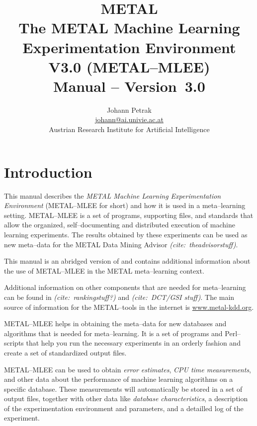 \documentclass[a4paper,10pt,twoside]{article}
\newcommand{\manualversion}{3.0}
\newcommand{\eeversion}{3.0}
\newcommand{\eenamelong}{METAL Machine Learning Experimentation Environment}
\newcommand{\eenameshort}{\textsf{METAL--MLEE}}
\newcommand{\citex}[1]{\textsl{(cite:~{#1})}}
\begin{document}
\author{Johann Petrak \\
  \url{johann@ai.univie.ac.at} \\[2em]
  Austrian Research Institute for
  Artificial Intelligence \\
}
\title{METAL \\[5em]
  The \textsf{ \eenamelong{}} V\eeversion{}  (\eenameshort{}) 
   \\[3em] Manual 
  -- Version~\manualversion{}
  }
\maketitle
\cleardoublepage
\tableofcontents
\cleardoublepage
\section{Introduction}

This manual describes the \emph{\eenamelong{}} (\eenameshort{} for short) and
how it is used in a meta--learning setting. 
\eenameshort{} is a set of programs, supporting files, and standards
that allow the 
organized, self--documenting and distributed execution of 
machine learning experiments. The results obtained by these 
experiments can be used as new meta--data for the METAL Data 
Mining Advisor \citex{theadvisorstuff}.

This manual is an abridged version of  \cite{Petrak:2002a} and
contains additional information about the use
of \eenameshort{} in the METAL meta--learning context.

Additional information on other components that are needed for meta--learning
can be found in \citex{rankingstuff?} and
\citex{DCT/GSI stuff}. The main source of information for the
METAL--tools in the internet is \url{www.metal-kdd.org}.


\eenameshort{} helps in obtaining the meta--data  
for new databases and algorithms
that is needed for meta--learning.
It is a set of 
programs and Perl--scripts that help you run the necessary experiments
in an orderly fashion and create a set of standardized output
files. 

\eenameshort{}  can be used to obtain
\emph{error estimates}, \emph{CPU time measurements},
and other data 
  about the performance of machine
learning algorithms on a specific database.
These measurements will automatically be stored in
a set of output files, together with other data like
\emph{database characteristics}, a description of
the experimentation environment and parameters, and
a detailled log of the experiment.
\end{document}
